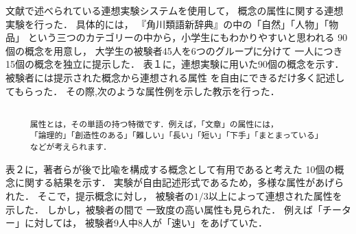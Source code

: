 文献\cite{OhkumaAndIshizaki1996}で述べられている連想実験システムを使用して，
概念の属性に関する連想実験を行った．
具体的には，
『角川類語新辞典』\cite{OhnoAndHamanishi1981}の中の「自然」「人物」「物品」
という三つのカテゴリーの中から，小学生にもわかりやすいと思われる
90個の概念を用意し，
大学生の被験者45人を6つのグループに分けて
一人につき15個の概念を独立に提示した．
表１に，連想実験に用いた90個の概念を示す．
被験者には提示された概念から連想される属性
を自由にできるだけ多く記述してもらった．
その際,次のような属性例を示した教示を行った．


\begin{footnotesize}
\begin{verbatim}

     属性とは，その単語の持つ特徴です．例えば，「文章」の属性には，
     「論理的」「創造性のある」「難しい」「長い」「短い」「下手」「まとまっている」
     などが考えられます．

\end{verbatim}
\end{footnotesize}



表２に，著者らが後で比喩を構成する概念として有用であると考えた
10個の概念に関する結果を示す．
実験が自由記述形式であるため，多様な属性があげられた．
そこで，提示概念に対し，
被験者の$1/3$以上によって連想された属性を示した．
しかし，被験者の間で
一致度の高い属性も見られた．
例えば「チーター」に対しては，
被験者9人中8人が「速い」をあげていた．



